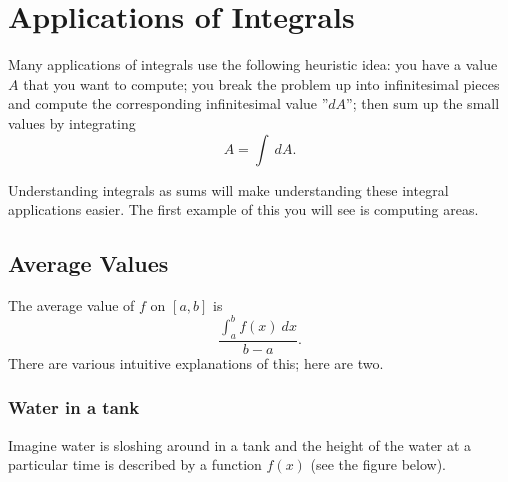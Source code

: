\section{Applications of Integrals}

Many applications of integrals use the following heuristic idea: you have a value $A$ that you want to compute; you break the problem up into infinitesimal pieces and compute the corresponding infinitesimal value ''$dA$''; then sum up the small values by integrating
$$A=\int\ dA.$$

Understanding integrals as sums will make understanding these integral applications easier.
The first example of this you will see is computing areas. 

\subsection{Average Values}

The average value of $f$ on $[a,b]$ is 
$$\frac{\displaystyle\int_a^bf(x)\ dx}{b-a}.$$
There are various intuitive explanations of this; here are two.

\subsubsection{Water in a tank}
Imagine water is sloshing around in a tank and the height of the water at a particular time is described by a function $f(x)$ (see the figure below). 

